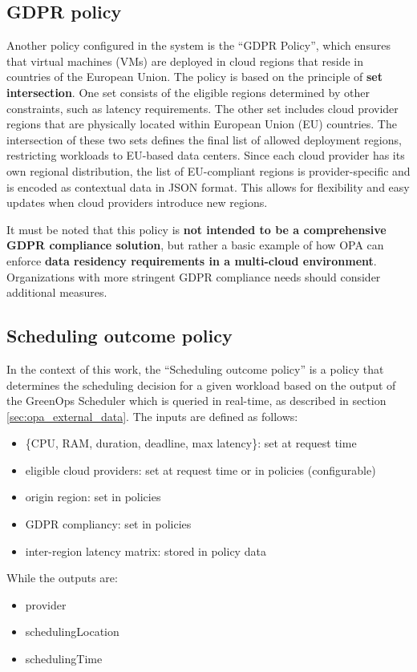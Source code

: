 \subsection{GDPR policy}

Another policy configured in the system is the ``GDPR Policy'', which ensures that virtual machines (VMs) are deployed in cloud regions that reside in countries of the European Union. 
The policy is based on the principle of \textbf{set intersection}. One set consists of the eligible regions determined by other constraints, such as latency requirements. The other set includes cloud provider regions that are physically located within European Union (EU) countries.
The intersection of these two sets defines the final list of allowed deployment regions, restricting workloads to EU-based data centers.
Since each cloud provider has its own regional distribution, the list of EU-compliant regions is provider-specific and is encoded as contextual data in JSON format. This allows for flexibility and easy updates when cloud providers introduce new regions.

It must be noted that this policy is \textbf{not intended to be a comprehensive GDPR compliance solution}, but rather a basic example of how OPA can enforce \textbf{data residency requirements in a multi-cloud environment}. Organizations with more stringent GDPR compliance needs should consider additional measures.

\subsection{Scheduling outcome policy}
\label{sec:scheduling_outcome_policy}

In the context of this work, the ``Scheduling outcome policy'' is a policy that determines the scheduling decision for a given workload based on the output of the GreenOps Scheduler which is queried in real-time, as described in section \ref{sec:opa_external_data}.
The inputs are defined as follows:
\begin{itemize}[itemsep=0.2pt, topsep=0.2pt]
  \item \{CPU, RAM, duration, deadline, max latency\}: set at request time
  \item eligible cloud providers: set at request time or in policies (configurable)
  \item origin region: set in policies
  \item GDPR compliancy: set in policies
  \item inter-region latency matrix: stored in policy data
\end{itemize}
While the outputs are:
\begin{itemize}[itemsep=0.2pt, topsep=0.2pt]
  \item provider
  \item schedulingLocation
  \item schedulingTime
\end{itemize}

